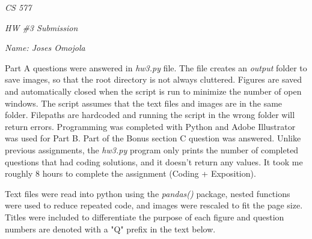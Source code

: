 \documentclass[12pt]{report}
\begin{document}
\centerline{\it CS 577}
\centerline{\it HW \#3 Submission}
\centerline{\it Name: Joses Omojola}

Part A questions were answered in \emph{hw3.py} file. The file creates an \emph{output} folder to save images, 
so that the root directory is not always cluttered. Figures are saved and automatically closed when the script is run to
minimize the number of open windows. The script assumes that the text files and images are in the same folder. Filepaths 
are hardcoded and running the script in the wrong folder will return errors. Programming was completed with 
Python and Adobe Illustrator was used for Part B. Part of the Bonus section C question was answered. Unlike previous assignments, 
the \emph{hw3.py} program only prints the number of completed questions that had coding solutions, and it doesn't return any values. 
It took me roughly 8 hours to complete the assignment (Coding + Exposition). 

Text files were read into python using the \emph{pandas()} package, nested functions were used to reduce repeated 
code, and images were rescaled to fit the page size. Titles were included to differentiate the purpose of each figure and 
question numbers are denoted with a "Q" prefix in the text below. 
\end{document}
